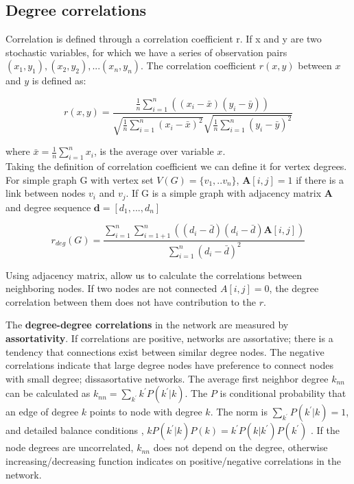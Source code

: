 \subsection{Degree correlations}

Correlation is defined through a correlation coefficient r. If x and y are two stochastic variables, for which we have a series of observation pairs $(x_1, y_1), (x_2, y_2), ... (x_n, y_n)$. The correlation coefficient $r(x, y)$ between $x$ and $y$ is defined as:

\begin{equation}
r(x, y) = \frac{\frac{1}{n}\sum_{i=1}^{n}((x_i - \bar{x} ) (y_i - \bar{y}) )}{\sqrt{\frac{1}{n}\sum_{i=1}^{n}(x_i - \bar{x})^2} \sqrt{\frac{1}{n}\sum_{i=1}^{n}(y_i - \bar{y})^2} }
\end{equation}

where $\bar{x} = \frac{1}{n}\sum_{i=1}^{n}x_i$, is the average over variable $x$. \\

Taking the definition of correlation coefficient we can define it for vertex degrees. For simple graph G with vertex set $V(G) = \{v_1, ..v_n\}$, $\boldsymbol{A}[i,j] = 1$ if there is a link between nodes $v_i$ and $v_j$. If G is a simple graph with adjacency matrix $\boldsymbol{A}$ and degree sequence $\boldsymbol{d} = [d_1, ..., d_n]$

\begin{equation}
r_{deg}(G) = \frac{\sum_{i=1}^{n}\sum_{i=1+1}^{n}((d_i - \bar{d}) (d_i - \bar{d}) \boldsymbol{A}[i,j] )}{\sum_{i=1}^{n}(d_i - \bar{d})^2}
\end{equation}

Using adjacency matrix, allow us to calculate the correlations between neighboring nodes. If two nodes are not connected $A[i,j]=0$, the degree correlation between them does not have contribution to the $r$.

The \textbf{degree-degree correlations} in the network are measured by \textbf{assortativity}. If correlations are positive, networks are assortative; there is a tendency that connections exist between similar degree nodes. The negative correlations indicate that large degree nodes have preference to connect nodes with small degree; dissasortative networks. The average first neighbor degree $k_{nn}$ can be calculated as $k_{nn} = \sum_{k^{'}}k^{'}P(k^{'}|{k})$. The $P$ is conditional probability that an edge of degree $k$ points to node with degree $k$. The norm is $\sum_{k^{'}}P(k^{'}|k)=1$, and detailed balance conditions \cite{boccaletti2006},  $kP(k^{'}|k)P(k) = k^{'}P(k|k^{'})P(k^{'})$ \cite{boccaletti2006}. If the node degrees are uncorrelated, $k_{nn}$ does not depend on the degree, otherwise increasing/decreasing function indicates on positive/negative correlations in the network. \\

